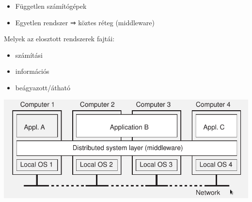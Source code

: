 \documentclass[twoside, a4paper, 12pt]{article}
\begin{document}
\begin{description}
\begin{itemize}
                                                                            \item Független számítógépek
                                                                            \item Egyetlen rendszer ⇒ köztes réteg (middleware)
                                                                        \end{itemize}
                                                                    \item
                                                                        Melyek az elosztott rendszerek fajtái:
                                                                        \begin{itemize}
                                                                            \item
                                                                                számítási
                                                                            \item
                                                                                információs
                                                                            \item
                                                                                beágyazott/átható
                                                                        \end{itemize}
                                                                        \begin{center}
                                                                        \includegraphics[scale=0.5]{images/ElosztottRendszer.png}
                                                                    \end{center}
                                                                \end{description}
\end{document}
